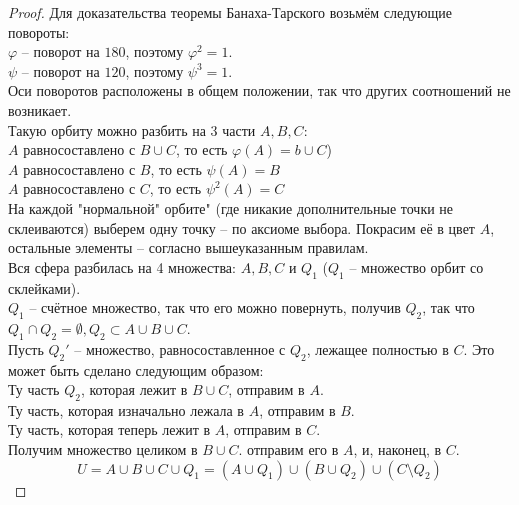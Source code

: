 \begin{theorem}
\begin{proof}
        Для доказательства теоремы Банаха-Тарского возьмём следующие повороты:\\
        
        $\varphi$ -- поворот на $180$, поэтому $\varphi^2 = 1$.\\
        
        $\psi$ -- поворот на $120$, поэтому $\psi^3 = 1$.\\
        
        Оси поворотов расположены в общем положении, так что других соотношений не возникает.\\
        
        Такую орбиту можно разбить на 3 части $A, B, C$:\\
        $A$ равносоставлено с $B \cup C$, то есть $\varphi(A) = b \cup C$)\\
        $A$ равносоставлено с $B$, то есть $\psi(A) = B$\\
        $A$ равносоставлено с $C$, то есть $\psi^2(A) = C$\\
        
        На каждой "нормальной" орбите" (где никакие дополнительные точки не склеиваются) выберем одну точку -- по аксиоме выбора. Покрасим её в цвет $A$, остальные элементы -- согласно вышеуказанным правилам.\\
        
        Вся сфера разбилась на 4 множества: $A, B, C$ и $Q_1$ ($Q_1$ -- множество орбит со склейками).\\
        
        $Q_1$ -- счётное множество, так что его можно повернуть, получив $Q_2$, так что $Q_1 \cap Q_2 = \emptyset, Q_2 \subset A \cup B \cup C$.\\
        
        Пусть $Q_2'$ -- множество, равносоставленное с $Q_2$, лежащее полностью в $C$. Это может быть сделано следующим образом:\\
        Ту часть $Q_2$, которая лежит в $B \cup C$, отправим в $A$.\\
        Ту часть, которая изначально лежала в $A$, отправим в $B$.\\
        Ту часть, которая теперь лежит в $A$, отправим в $C$.\\
        Получим множество целиком в $B \cup C$. отправим его в $A$, и, наконец, в $C$.\\
        
        $$
            U = A \cup B \cup C \cup Q_1 = (A \cup Q_1) \cup (B \cup Q_2) \cup (C \setminus  Q_2)
        $$
        

\end{proof}
\end{theorem}
